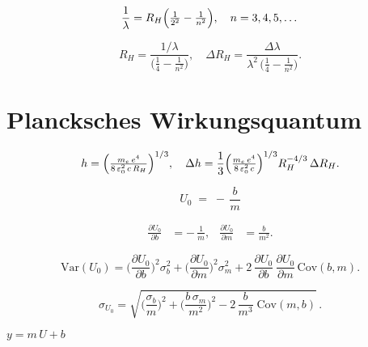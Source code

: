\begin{equation}
  \frac{1}{\lambda}
  = R_H\Bigl(\tfrac{1}{2^{2}} - \tfrac{1}{n^{2}}\Bigr),
  \quad n=3,4,5,\dots
\end{equation}

\begin{equation}
  R_H
  = \frac{1/\lambda}{\bigl(\tfrac{1}{4} - \tfrac{1}{n^{2}}\bigr)},
  \quad
  \Delta R_H
  = \frac{\Delta\lambda}{\lambda^{2}\,\bigl(\tfrac{1}{4} - \tfrac{1}{n^{2}}\bigr)}.
\end{equation}

\section*{Plancksches Wirkungsquantum}

\begin{equation}
  h
  = \Bigl(\tfrac{m_e\,e^{4}}{8\,\varepsilon_{0}^{2}\,c\,R_H}\Bigr)^{1/3},
  \quad
  \Delta h
  = \frac{1}{3}
    \Bigl(\tfrac{m_e\,e^{4}}{8\,\varepsilon_{0}^{2}\,c}\Bigr)^{1/3}
    R_H^{-4/3}\,\Delta R_H.
\end{equation}

\begin{equation}
U_{0} \;=\; -\,\frac{b}{m}
\end{equation}

\begin{align}
\frac{\partial U_{0}}{\partial b} &= -\,\frac{1}{m}, 
&
\frac{\partial U_{0}}{\partial m} &= \frac{b}{m^{2}}.
\end{align}

\begin{equation}
\mathrm{Var}(U_{0})
= \biggl(\frac{\partial U_{0}}{\partial b}\biggr)^{2} \sigma_{b}^{2}
+ \biggl(\frac{\partial U_{0}}{\partial m}\biggr)^{2} \sigma_{m}^{2}
+ 2\,\frac{\partial U_{0}}{\partial b}\,\frac{\partial U_{0}}{\partial m}\,\mathrm{Cov}(b,m).
\end{equation}

\begin{equation}
\sigma_{U_{0}}
= \sqrt{
\biggl(\frac{\sigma_{b}}{m}\biggr)^{2}
+ \biggl(\frac{b\,\sigma_{m}}{m^{2}}\biggr)^{2}
-2\,\frac{b}{m^{3}}\;\mathrm{Cov}(m,b)
}\,.
\end{equation}

$y = m\,U + b$
